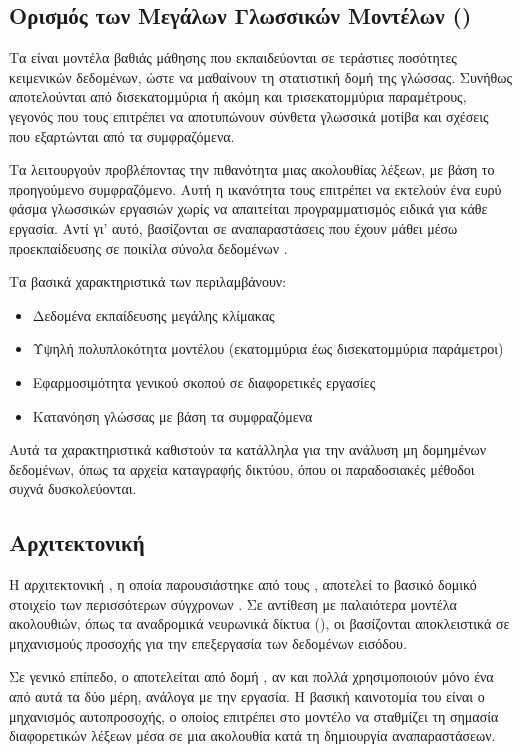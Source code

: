 \subsection{Ορισμός των Μεγάλων Γλωσσικών Μοντέλων ()}

Τα  είναι μοντέλα βαθιάς μάθησης που εκπαιδεύονται σε τεράστιες ποσότητες κειμενικών δεδομένων, ώστε να μαθαίνουν τη στατιστική δομή της γλώσσας. Συνήθως αποτελούνται από δισεκατομμύρια ή ακόμη και τρισεκατομμύρια παραμέτρους, γεγονός που τους επιτρέπει να αποτυπώνουν σύνθετα γλωσσικά μοτίβα και σχέσεις που εξαρτώνται από τα συμφραζόμενα.

Τα  λειτουργούν προβλέποντας την πιθανότητα μιας ακολουθίας λέξεων, με βάση το προηγούμενο συμφραζόμενο. Αυτή η ικανότητα τους επιτρέπει να εκτελούν ένα ευρύ φάσμα γλωσσικών εργασιών χωρίς να απαιτείται προγραμματισμός ειδικά για κάθε εργασία. Αντί γι’ αυτό, βασίζονται σε αναπαραστάσεις που έχουν μάθει μέσω προεκπαίδευσης σε ποικίλα σύνολα δεδομένων \cite{brown2020language}.

Τα βασικά χαρακτηριστικά των  περιλαμβάνουν:
\begin{itemize}
\item Δεδομένα εκπαίδευσης μεγάλης κλίμακας
\item Υψηλή πολυπλοκότητα μοντέλου (εκατομμύρια έως δισεκατομμύρια παράμετροι)
\item Εφαρμοσιμότητα γενικού σκοπού σε διαφορετικές εργασίες
\item Κατανόηση γλώσσας με βάση τα συμφραζόμενα
\end{itemize}

Αυτά τα χαρακτηριστικά καθιστούν τα  κατάλληλα για την ανάλυση μη δομημένων δεδομένων, όπως τα αρχεία καταγραφής δικτύου, όπου οι παραδοσιακές μέθοδοι συχνά δυσκολεύονται.

\subsection{Αρχιτεκτονική }

Η αρχιτεκτονική , η οποία παρουσιάστηκε από τους  \cite{vaswani2017attention}, αποτελεί το βασικό δομικό στοιχείο των περισσότερων σύγχρονων . Σε αντίθεση με παλαιότερα μοντέλα ακολουθιών, όπως τα αναδρομικά νευρωνικά δίκτυα (), οι  βασίζονται αποκλειστικά σε μηχανισμούς προσοχής για την επεξεργασία των δεδομένων εισόδου.

Σε γενικό επίπεδο, ο  αποτελείται από δομή , αν και πολλά  χρησιμοποιούν μόνο ένα από αυτά τα δύο μέρη, ανάλογα με την εργασία. Η βασική καινοτομία του  είναι ο μηχανισμός αυτοπροσοχής, ο οποίος επιτρέπει στο μοντέλο να σταθμίζει τη σημασία διαφορετικών λέξεων μέσα σε μια ακολουθία κατά τη δημιουργία αναπαραστάσεων.

